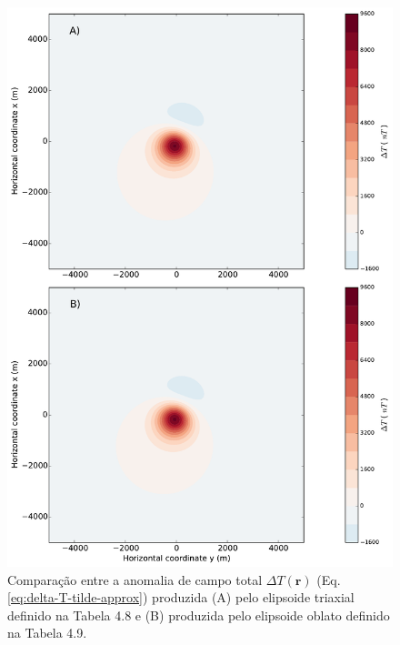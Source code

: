 \begin{figure}[hbt!]
	\centering \includegraphics[width=14.5 cm,height=22 cm]{figures/ellipsoid_triaxial_oblate}
	\caption[Comparação entre a anomalia de campo total $\Delta T (\mathbf{r})$ (Eq. \ref{eq:delta-T-tilde-approx}) produzida (A) pelo elipsoide triaxial definido na Tabela 4.8 e (B) produzida pelo elipsoide oblato definido na Tabela 4.9.]{Comparação entre a anomalia de campo total $\Delta T (\mathbf{r})$ (Eq. \ref{eq:delta-T-tilde-approx}) produzida (A) pelo elipsoide triaxial definido na Tabela 4.8 e (B) produzida pelo elipsoide oblato definido na Tabela 4.9.}
	\label{fig:triaxial_oblate}
\end{figure}

